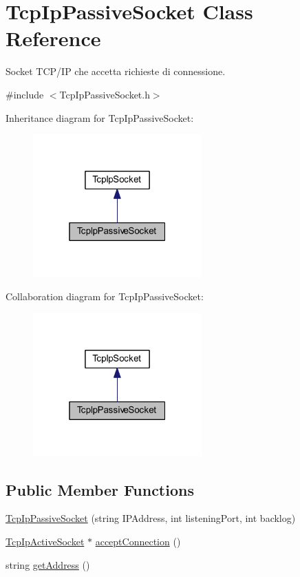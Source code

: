 \hypertarget{class_tcp_ip_passive_socket}{
\section{TcpIpPassiveSocket Class Reference}
\label{class_tcp_ip_passive_socket}
}


Socket TCP/IP che accetta richieste di connessione.  




{\ttfamily \#include $<$TcpIpPassiveSocket.h$>$}



Inheritance diagram for TcpIpPassiveSocket:\nopagebreak
\begin{figure}[H]
\begin{center}
\leavevmode
\includegraphics[width=184pt]{class_tcp_ip_passive_socket__inherit__graph}
\end{center}
\end{figure}


Collaboration diagram for TcpIpPassiveSocket:\nopagebreak
\begin{figure}[H]
\begin{center}
\leavevmode
\includegraphics[width=184pt]{class_tcp_ip_passive_socket__coll__graph}
\end{center}
\end{figure}
\subsection*{Public Member Functions}
\begin{DoxyCompactItemize}
\item 
\hyperlink{class_tcp_ip_passive_socket_abbfbfbfee533e19b5f5013b41193497a}{TcpIpPassiveSocket} (string IPAddress, int listeningPort, int backlog)
\item 
\hyperlink{class_tcp_ip_active_socket}{TcpIpActiveSocket} $\ast$ \hyperlink{class_tcp_ip_passive_socket_ac8253b2b30e5c6fd0dc551f096a4e622}{acceptConnection} ()
\item 
string \hyperlink{class_tcp_ip_passive_socket_ab7f3e7d14e408ad4e3ab5c12a63644c7}{getAddress} ()
\end{DoxyCompactItemize}
